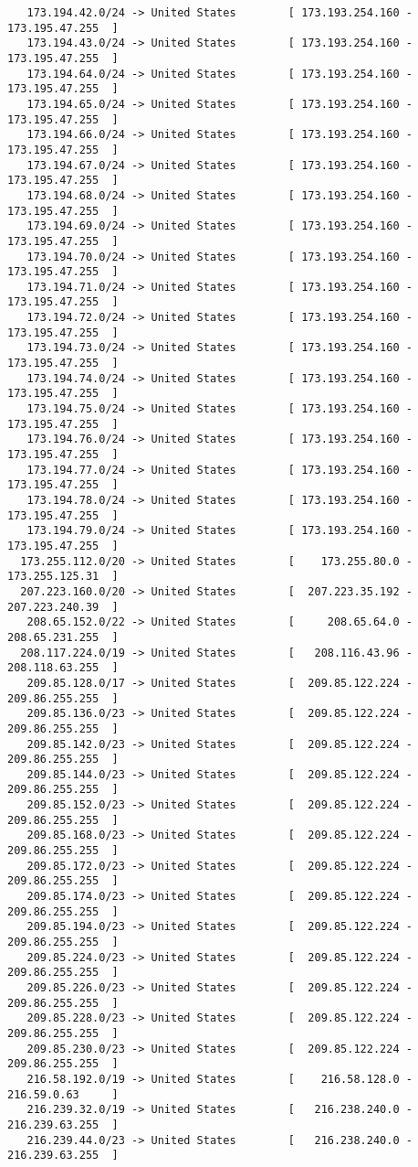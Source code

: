 \documentclass[10pt,a4paper,twoside,onecolumn]{article}
\begin{document}
\begin{lstlisting}
   173.194.42.0/24 -> United States        [ 173.193.254.160 - 173.195.47.255  ]
   173.194.43.0/24 -> United States        [ 173.193.254.160 - 173.195.47.255  ]
   173.194.64.0/24 -> United States        [ 173.193.254.160 - 173.195.47.255  ]
   173.194.65.0/24 -> United States        [ 173.193.254.160 - 173.195.47.255  ]
   173.194.66.0/24 -> United States        [ 173.193.254.160 - 173.195.47.255  ]
   173.194.67.0/24 -> United States        [ 173.193.254.160 - 173.195.47.255  ]
   173.194.68.0/24 -> United States        [ 173.193.254.160 - 173.195.47.255  ]
   173.194.69.0/24 -> United States        [ 173.193.254.160 - 173.195.47.255  ]
   173.194.70.0/24 -> United States        [ 173.193.254.160 - 173.195.47.255  ]
   173.194.71.0/24 -> United States        [ 173.193.254.160 - 173.195.47.255  ]
   173.194.72.0/24 -> United States        [ 173.193.254.160 - 173.195.47.255  ]
   173.194.73.0/24 -> United States        [ 173.193.254.160 - 173.195.47.255  ]
   173.194.74.0/24 -> United States        [ 173.193.254.160 - 173.195.47.255  ]
   173.194.75.0/24 -> United States        [ 173.193.254.160 - 173.195.47.255  ]
   173.194.76.0/24 -> United States        [ 173.193.254.160 - 173.195.47.255  ]
   173.194.77.0/24 -> United States        [ 173.193.254.160 - 173.195.47.255  ]
   173.194.78.0/24 -> United States        [ 173.193.254.160 - 173.195.47.255  ]
   173.194.79.0/24 -> United States        [ 173.193.254.160 - 173.195.47.255  ]
  173.255.112.0/20 -> United States        [    173.255.80.0 - 173.255.125.31  ]
  207.223.160.0/20 -> United States        [  207.223.35.192 - 207.223.240.39  ]
   208.65.152.0/22 -> United States        [     208.65.64.0 - 208.65.231.255  ]
  208.117.224.0/19 -> United States        [   208.116.43.96 - 208.118.63.255  ]
   209.85.128.0/17 -> United States        [  209.85.122.224 - 209.86.255.255  ]
   209.85.136.0/23 -> United States        [  209.85.122.224 - 209.86.255.255  ]
   209.85.142.0/23 -> United States        [  209.85.122.224 - 209.86.255.255  ]
   209.85.144.0/23 -> United States        [  209.85.122.224 - 209.86.255.255  ]
   209.85.152.0/23 -> United States        [  209.85.122.224 - 209.86.255.255  ]
   209.85.168.0/23 -> United States        [  209.85.122.224 - 209.86.255.255  ]
   209.85.172.0/23 -> United States        [  209.85.122.224 - 209.86.255.255  ]
   209.85.174.0/23 -> United States        [  209.85.122.224 - 209.86.255.255  ]
   209.85.194.0/23 -> United States        [  209.85.122.224 - 209.86.255.255  ]
   209.85.224.0/23 -> United States        [  209.85.122.224 - 209.86.255.255  ]
   209.85.226.0/23 -> United States        [  209.85.122.224 - 209.86.255.255  ]
   209.85.228.0/23 -> United States        [  209.85.122.224 - 209.86.255.255  ]
   209.85.230.0/23 -> United States        [  209.85.122.224 - 209.86.255.255  ]
   216.58.192.0/19 -> United States        [    216.58.128.0 - 216.59.0.63     ]
   216.239.32.0/19 -> United States        [   216.238.240.0 - 216.239.63.255  ]
   216.239.44.0/23 -> United States        [   216.238.240.0 - 216.239.63.255  ]
\end{lstlisting}
\end{document}

